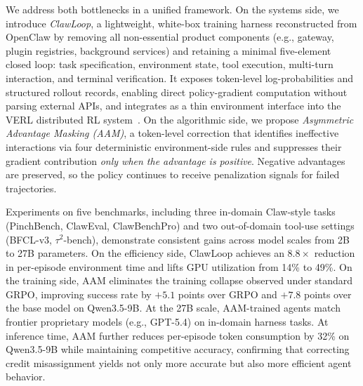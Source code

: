 \documentclass[letterpaper]{article} %
\begin{document}
We address both bottlenecks in a unified framework.
On the systems side, we introduce \textit{ClawLoop}, a lightweight, white-box training harness reconstructed from OpenClaw by removing all non-essential product components (e.g., gateway, plugin registries, background services) and retaining a minimal five-element closed loop:
task specification, environment state, tool execution, multi-turn interaction, and terminal verification. 
It exposes token-level log-probabilities and structured rollout records, enabling direct policy-gradient computation without parsing external APIs, and integrates as a thin environment interface into the VERL distributed RL system~\citep{sheng2024verl}.
On the algorithmic side, we propose \textit{Asymmetric Advantage Masking (AAM)}, a token-level correction that identifies ineffective interactions via four deterministic environment-side rules and suppresses their gradient contribution \emph{only when the advantage is positive}. 
Negative advantages are preserved, so the policy continues to receive penalization signals for failed trajectories. 

Experiments on five benchmarks, including three in-domain Claw-style tasks (PinchBench, ClawEval, ClawBenchPro) and two out-of-domain tool-use settings (BFCL-v3, $\tau^2$-bench), demonstrate consistent gains across model scales from 2B to 27B parameters.
On the efficiency side, ClawLoop achieves an $8.8\times$ reduction in per-episode environment time and lifts GPU utilization from 14\% to 49\%. 
On the training side, AAM eliminates the training collapse observed under standard GRPO, improving success rate by $+5.1$ points over
GRPO and $+7.8$ points over the base model on Qwen3.5-9B.
At the 27B scale, AAM-trained agents match frontier proprietary models (e.g., GPT-5.4) on in-domain harness tasks.
At inference time, AAM further reduces per-episode token consumption by 32\% on Qwen3.5-9B while maintaining competitive accuracy,
confirming that correcting credit misassignment yields not only more accurate but also more efficient agent behavior.

\end{document}

